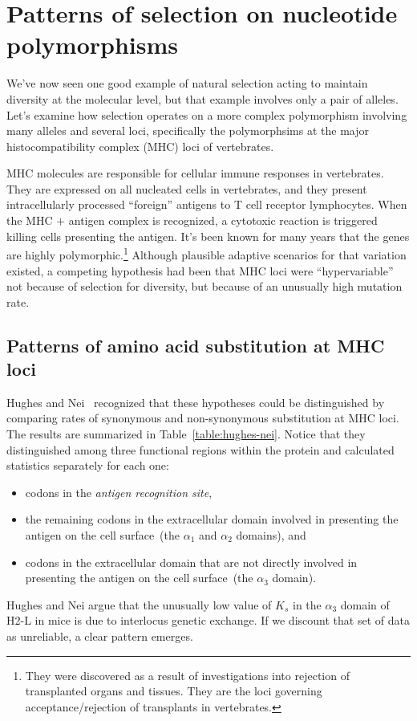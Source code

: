 \chapter{Patterns of selection on nucleotide polymorphisms}

We've now seen one good example of natural selection acting to
maintain diversity at the molecular level, but that example involves
only a pair of alleles. Let's examine how selection operates on a more
complex polymorphism involving many alleles and several loci,
specifically the polymorphsims at the major histocompatibility complex
(MHC) loci of vertebrates.

MHC molecules are responsible for cellular immune responses in
vertebrates. They are expressed on all nucleated cells in vertebrates,
and they present intracellularly processed ``foreign'' antigens to T
cell receptor lymphocytes. When the MHC $+$ antigen complex is
recognized, a cytotoxic reaction is triggered killing cells presenting
the antigen. It's been known for many years that the genes are highly
polymorphic.\footnote{They were discovered as a result of
  investigations into rejection of transplanted organs and
  tissues. They are the loci governing acceptance/rejection of
  transplants in vertebrates.} Although plausible adaptive scenarios
for that variation existed, a competing hypothesis had been that MHC
loci were ``hypervariable'' not because of selection for diversity,
but because of an unusually high mutation rate.

\section*{Patterns of amino acid substitution at MHC loci}

Hughes and Nei~\cite{Hughes-Nei88} recognized that these hypotheses
could be distinguished by comparing rates of synonymous and
non-synonymous substitution at MHC loci. The results are summarized
in Table~\ref{table:hughes-nei}. Notice that they distinguished among
three functional regions within the protein and calculated statistics
separately for each one:

\begin{itemize}

\item codons in the {\it antigen recognition site},

\item the remaining codons in the extracellular domain involved in
  presenting the antigen on the cell surface~(the $\alpha_1$ and
  $\alpha_2$ domains), and

\item codons in the extracellular domain that are not directly
  involved in presenting the antigen on the cell surface~(the
  $\alpha_3$ domain).

\end{itemize}
Hughes and Nei argue that the unusually low value of $K_s$ in the
$\alpha_3$ domain of H2-L in mice is due to interlocus genetic
exchange. If we discount that set of data as unreliable, a clear
pattern emerges.

